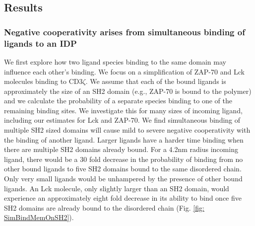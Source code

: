 \documentclass[../../AdvancementSummary.tex]{subfiles}
\begin{document}

\subsection{Results}

\subsubsection{Negative cooperativity arises from simultaneous binding of ligands to an IDP}

We first explore how two ligand species binding to the same domain may influence each other's binding. We focus on a simplification of ZAP-70 and Lck molecules binding to CD3$\zeta$. We assume that each of the bound ligands is approximately the size of an SH2 domain (e.g., ZAP-70 is bound to the polymer) and we calculate the probability of a separate species binding to one of the remaining binding sites. We investigate this for many sizes of incoming ligand, including our estimates for Lck and ZAP-70. We find simultaneous binding of multiple SH2 sized domains will cause mild to severe negative cooperativity with the binding of another ligand. Larger ligands have a harder time binding when there are multiple SH2 domains already bound. For a 4.2nm radius incoming ligand, there would be a 30 fold decrease in the probability of binding from no other bound ligands to five SH2 domains bound to the same disordered chain. Only very small ligands would be unhampered by the presence of other bound ligands. An Lck molecule, only slightly larger than an SH2 domain, would experience an approximately eight fold decrease in its ability to bind once five SH2 domains are already bound to the disordered chain (Fig. \ref{fig: SimBindMemOnSH2}).
\end{document}
